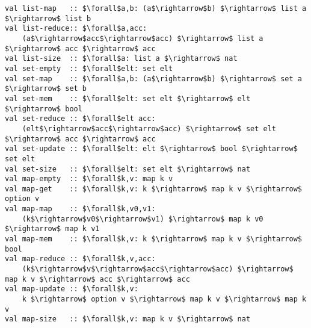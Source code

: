 \documentclass[10pt,landscape,a4paper]{article}
\begin{document}
\begin{multicols*}{3}
\begin{lstlisting}
val list-map   :: $\forall$a,b: (a$\rightarrow$b) $\rightarrow$ list a $\rightarrow$ list b
val list-reduce:: $\forall$a,acc:
    (a$\rightarrow$acc$\rightarrow$acc) $\rightarrow$ list a $\rightarrow$ acc $\rightarrow$ acc
val list-size  :: $\forall$a: list a $\rightarrow$ nat
val set-empty  :: $\forall$elt: set elt
val set-map    :: $\forall$a,b: (a$\rightarrow$b) $\rightarrow$ set a $\rightarrow$ set b
val set-mem    :: $\forall$elt: set elt $\rightarrow$ elt $\rightarrow$ bool
val set-reduce :: $\forall$elt acc:
    (elt$\rightarrow$acc$\rightarrow$acc) $\rightarrow$ set elt $\rightarrow$ acc $\rightarrow$ acc
val set-update :: $\forall$elt: elt $\rightarrow$ bool $\rightarrow$ set elt
val set-size   :: $\forall$elt: set elt $\rightarrow$ nat
val map-empty  :: $\forall$k,v: map k v
val map-get    :: $\forall$k,v: k $\rightarrow$ map k v $\rightarrow$ option v
val map-map    :: $\forall$k,v0,v1:
    (k$\rightarrow$v0$\rightarrow$v1) $\rightarrow$ map k v0 $\rightarrow$ map k v1
val map-mem    :: $\forall$k,v: k $\rightarrow$ map k v $\rightarrow$ bool
val map-reduce :: $\forall$k,v,acc:
    (k$\rightarrow$v$\rightarrow$acc$\rightarrow$acc) $\rightarrow$ map k v $\rightarrow$ acc $\rightarrow$ acc
val map-update :: $\forall$k,v:
    k $\rightarrow$ option v $\rightarrow$ map k v $\rightarrow$ map k v
val map-size   :: $\forall$k,v: map k v $\rightarrow$ nat
\end{lstlisting}

\end{multicols*}
\end{document}
